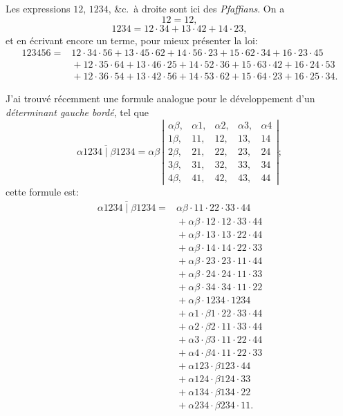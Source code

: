 \documentclass[11pt,a4paper]{article}
\begin{document}
\medskip

Les expressions $12$, $1234$, \&c.\ \`a droite sont ici des \textit{Pfaffians}. On a
\[
12 = 12,
\]
\[
1234 = 12\cdot 34 + 13\cdot 42 + 14\cdot 23,
\]
et en \'ecrivant encore un terme, pour mieux pr\'esenter la loi:
\begin{align*}
123456 ={}& 12\cdot 34\cdot 56 + 13\cdot 45\cdot 62 + 14\cdot 56\cdot 23 + 15\cdot 62\cdot 34 + 16\cdot 23\cdot 45\\
&{}+12\cdot 35\cdot 64 + 13\cdot 46\cdot 25 + 14\cdot 52\cdot 36 + 15\cdot 63\cdot 42 + 16\cdot 24\cdot 53\\
&{}+12\cdot 36\cdot 54 + 13\cdot 42\cdot 56 + 14\cdot 53\cdot 62 + 15\cdot 64\cdot 23 + 16\cdot 25\cdot 34.
\end{align*}

\medskip

J'ai trouv\'e r\'ecemment une formule analogue pour le d\'eveloppement d'un \textit{d\'eterminant gauche bord\'e}, tel que
\[
\overline{\alpha 1234 \mid \beta 1234} = \alpha\beta\,
\left\lvert\begin{array}{ccccc}
\alpha\beta, & \alpha 1, & \alpha 2, & \alpha 3, & \alpha 4\\
1\beta, & 11, & 12, & 13, & 14\\
2\beta, & 21, & 22, & 23, & 24\\
3\beta, & 31, & 32, & 33, & 34\\
4\beta, & 41, & 42, & 43, & 44
\end{array}\right\rvert ;
\]
cette formule est:
\begin{align*}
\overline{\alpha 1234 \mid \beta 1234} ={}& \alpha\beta\cdot 11\cdot 22\cdot 33\cdot 44\\
&{}+ \alpha\beta\cdot 12\cdot 12\cdot 33\cdot 44\\
&{}+ \alpha\beta\cdot 13\cdot 13\cdot 22\cdot 44\\
&{}+ \alpha\beta\cdot 14\cdot 14\cdot 22\cdot 33\\
&{}+ \alpha\beta\cdot 23\cdot 23\cdot 11\cdot 44\\
&{}+ \alpha\beta\cdot 24\cdot 24\cdot 11\cdot 33\\
&{}+ \alpha\beta\cdot 34\cdot 34\cdot 11\cdot 22\\
&{}+ \alpha\beta\cdot 1234\cdot 1234\\
&{}+ \alpha 1\cdot \beta 1\cdot 22\cdot 33\cdot 44\\
&{}+ \alpha 2\cdot \beta 2\cdot 11\cdot 33\cdot 44\\
&{}+ \alpha 3\cdot \beta 3\cdot 11\cdot 22\cdot 44\\
&{}+ \alpha 4\cdot \beta 4\cdot 11\cdot 22\cdot 33\\
&{}+ \alpha 123\cdot \beta 123\cdot 44\\
&{}+ \alpha 124\cdot \beta 124\cdot 33\\
&{}+ \alpha 134\cdot \beta 134\cdot 22\\
&{}+ \alpha 234\cdot \beta 234\cdot 11.
\end{align*}
\end{document}

